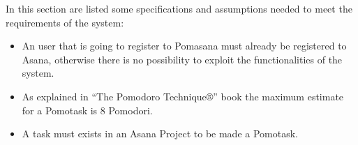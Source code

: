 	In this section are listed some specifications and assumptions needed to meet the requirements of the system:

		\begin{itemize}

			\item An user that is going to register to Pomasana must already be registered to Asana, otherwise there is no possibility to exploit the functionalities of the system.

			\item As explained in “The Pomodoro Technique®” book the maximum estimate for a Pomotask is 8 Pomodori.

			\item A task must exists in an Asana Project to be made a Pomotask.


		\end{itemize}

